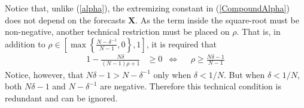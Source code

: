 \documentclass[11pt,twoside]{article}
\begin{document}
Notice that, unlike (\ref{alpha}), the extremizing constant in (\ref{CompoundAlpha}) does not depend on the forecasts $\boldsymbol{X}$. As the term inside the square-root must be non-negative, another technical restriction must be placed on $\rho$. That is, in addition to $\rho \in \left[  \max \left\{ \frac{N-\delta^{-1}}{N-1}, 0\right\}, 1 \right]$, it is required that
\begin{align*}
1- \frac{N\delta}{(N-1)\rho +1}  &\geq 0 &\Leftrightarrow&& \rho \geq \frac{N\delta - 1}{N-1}
\end{align*}
Notice, however, that $N\delta - 1 > N - \delta^{-1}$ only when $\delta < 1/N$. But when $\delta < 1/N$, both $N\delta - 1$ and $N - \delta^{-1}$ are negative. Therefore this technical condition is redundant and can be ignored. 




\end{document}
